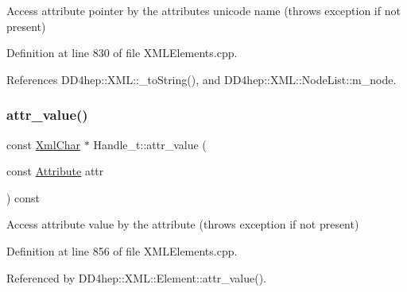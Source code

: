 Access attribute pointer by the attribute\textquotesingle{}s unicode name (throws exception if not present) 



Definition at line 830 of file X\+M\+L\+Elements.\+cpp.



References D\+D4hep\+::\+X\+M\+L\+::\+\_\+to\+String(), and D\+D4hep\+::\+X\+M\+L\+::\+Node\+List\+::m\+\_\+node.

\hypertarget{class_d_d4hep_1_1_x_m_l_1_1_handle__t_ae6100371b221d2e5bd7528384d37ec73}{}\label{class_d_d4hep_1_1_x_m_l_1_1_handle__t_ae6100371b221d2e5bd7528384d37ec73} 
\subsubsection{\texorpdfstring{attr\+\_\+value()}{attr\_value()}\hspace{0.1cm}{\footnotesize\ttfamily [1/2]}}
{\footnotesize\ttfamily const \hyperlink{namespace_d_d4hep_1_1_x_m_l_a09e5d9cc86ed782f6826dfe0778c1815}{Xml\+Char} $\ast$ Handle\+\_\+t\+::attr\+\_\+value (\begin{DoxyParamCaption}\item[{const \hyperlink{namespace_d_d4hep_1_1_x_m_l_a5c19b7116be99d69b4b22d911357baaf}{Attribute}}]{attr }\end{DoxyParamCaption}) const}



Access attribute value by the attribute (throws exception if not present) 



Definition at line 856 of file X\+M\+L\+Elements.\+cpp.



Referenced by D\+D4hep\+::\+X\+M\+L\+::\+Element\+::attr\+\_\+value().

\hypertarget{class_d_d4hep_1_1_x_m_l_1_1_handle__t_a48291a1224fba91941a4d1ce7e092181}{}\label{class_d_d4hep_1_1_x_m_l_1_1_handle__t_a48291a1224fba91941a4d1ce7e092181} 
